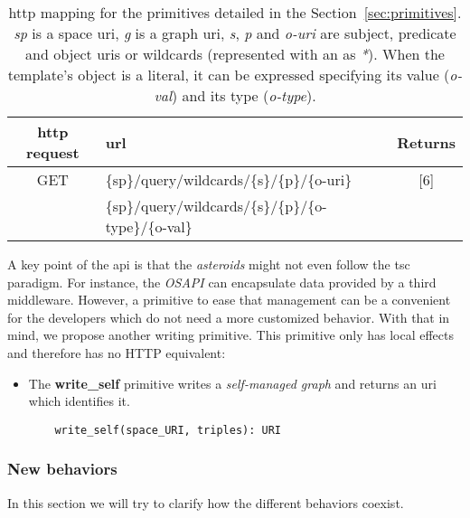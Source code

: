 \begin{table} %
  \centering
  \caption {
    \acs{http} mapping for the primitives detailed in the Section~\ref{sec:primitives}. \textit{sp} is a space \acs{uri},
    \textit{g} is a graph \acs{uri}, \textit{s}, \textit{p} and \textit{o-uri} are subject, predicate and object \acsp{uri} or wildcards (represented with an as \textit{*}).
    When the template's object is a literal, it can be expressed specifying its value (\textit{o-val}) and its type (\textit{o-type}).
    \medskip
  }
  \begin{tabular}{c|l|c}
      \acs{http} request & \acs{url} & Returns \\
      \hline
      GET & \{sp\}/query/wildcards/\{s\}/\{p\}/\{o-uri\} &  [6] \\
      & \{sp\}/query/wildcards/\{s\}/\{p\}/\{o-type\}/\{o-val\} & \\
  \end{tabular}
  \label{tab:queryAPI}
\end{table}


A key point of the \ac{api} is that the \emph{asteroids} might not even follow the \ac{tsc} paradigm.
For instance, the \emph{OSAPI} can encapsulate data provided by a third middleware.
However, a primitive to ease that management can be a convenient for the developers which do not need a more customized behavior.
With that in mind, we propose another writing primitive.
This primitive only has local effects and therefore has no HTTP equivalent:
\begin{itemize}
  \item The \textbf{write\_self} primitive writes a \emph{self-managed graph} and returns an \ac{uri} which identifies it.
  
  \begin{lstlisting}
    write_self(space_URI, triples): URI
  \end{lstlisting}
\end{itemize}



\subsubsection{New behaviors}

In this section we will try to clarify how the different behaviors coexist.

